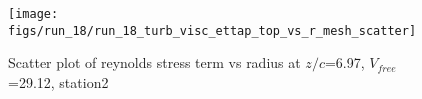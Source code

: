 \begin{figure}[H]
\centering
\texttt{[image: figs/run\_18/run\_18\_turb\_visc\_ettap\_top\_vs\_r\_mesh\_scatter]}
\caption{Scatter plot of reynolds stress term vs radius at $z/c$=6.97, $V_{free}$=29.12, station2}
\label{fig:run_18_turb_visc_ettap_top_vs_r_mesh_scatter}
\end{figure}


